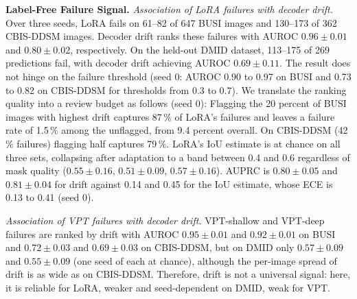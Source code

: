 \documentclass[runningheads]{llncs}
\begin{document}
\begin{table}[tbp]
  \centering
  \caption{AUROC for detecting per-image failures (Dice $<$ 0.5) at tight boxes, mean $\pm$ std over three seeds (single value: seed 0 only): decoder drift (Eq.~\eqref{eq:drift}) versus the decoder's IoU estimate. Cells with fewer than 20 failures omitted; drift is zero by construction for zero-shot.}
  \label{tab:detect}
  \resizebox{\linewidth}{!}{}
\end{table}

\textbf{Label-Free Failure Signal.} \emph{Association of LoRA failures with decoder drift.} Over three seeds, LoRA fails on 61--82 of 647 BUSI images and 130--173 of 362 CBIS-DDSM images. Decoder drift ranks these failures with AUROC $0.96 \pm 0.01$ and $0.80 \pm 0.02$, respectively. On the held-out DMID dataset, 113--175 of 269 predictions fail, with decoder drift achieving AUROC $0.69 \pm 0.11$. The result does not hinge on the failure threshold (seed 0: AUROC 0.90 to 0.97 on BUSI and 0.73 to 0.82 on CBIS-DDSM for thresholds from 0.3 to 0.7). We translate the ranking quality into a review budget as follows (seed 0): Flagging the 20 percent of BUSI images with highest drift captures 87\,\% of LoRA's failures and leaves a failure rate of 1.5\,\% among the unflagged, from 9.4 percent overall. On CBIS-DDSM (42\,\% failures) flagging half captures 79\,\%. LoRA's IoU estimate is at chance on all three sets, collapsing after adaptation to a band between 0.4 and 0.6 regardless of mask quality ($0.55 \pm 0.16$, $0.51 \pm 0.09$, $0.57 \pm 0.16$). AUPRC is $0.80 \pm 0.05$ and $0.81 \pm 0.04$ for drift against 0.14 and 0.45 for the IoU estimate, whose ECE is 0.13 to 0.41 (seed 0).

\emph{Association of VPT failures with decoder drift.} VPT-shallow and VPT-deep failures are ranked by drift with AUROC $0.95 \pm 0.01$ and $0.92 \pm 0.01$ on BUSI and $0.72 \pm 0.03$ and $0.69 \pm 0.03$ on CBIS-DDSM, but on DMID only $0.57 \pm 0.09$ and $0.55 \pm 0.09$ (one seed of each at chance), although the per-image spread of drift is as wide as on CBIS-DDSM. Therefore, drift is not a universal signal: here, it is reliable for LoRA, weaker and seed-dependent on DMID, weak for VPT.
\end{document}
